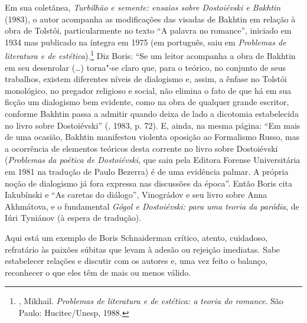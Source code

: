 Em sua coletânea, \emph{Turbilhão e semente: ensaios sobre Dostoiévski e
  Bakhtin} (1983), o autor acompanha as
modificações das visadas de Bakhtin em relação à obra de Tolstói,
particularmente no texto ``A palavra no romance'', iniciado em 1934 mas
publicado na íntegra em 1975 (em português, saiu em \emph{Problemas de
literatura e de estética}).\footnote{, Mikhail. \emph{Problemas
  de literatura e de estética: a teoria do romance}. São Paulo:
  Hucitec/Unesp, 1988.} Diz Boris: ``Se um leitor acompanha a obra de
Bakhtin em seu desenrolar (\ldots{}) torna"-se claro que, para o teórico, no
conjunto de seus trabalhos, existem diferentes níveis de dialogismo e,
assim, a ênfase no Tolstói monológico, no pregador religioso e social,
não elimina o fato de que há em sua ficção um dialogismo bem evidente,
como na obra de qualquer grande escritor, conforme Bakhtin passa a
admitir quando deixa de lado a dicotomia estabelecida no livro sobre
Dostoiévski'' (, 1983, p. 72). E, ainda, na mesma página:
``Em mais de uma ocasião, Bakhtin manifestou violenta oposição ao
Formalismo Russo, mas a ocorrência de elementos teóricos desta corrente
no livro sobre Dostoiévski (\emph{Problemas da poética de Dostoiévski},
que saiu pela Editora Forense Universitária em 1981 na tradução de Paulo
Bezerra) é de uma evidência palmar. A própria noção de dialogismo já
fora expressa nas discussões da época''. Então Boris cita Iakubínski e
``As caretas do diálogo'', Vinográdov e seu livro sobre Anna Akhmátova,
e o fundamental \emph{Gógol e Dostoiévski: para uma teoria da paródia},
de Iúri Tyniánov (à espera de tradução).

Aqui está um exemplo de Boris Schnaiderman crítico, atento, cuidadoso,
refratário às paixões súbitas que levam à adesão ou rejeição imediatas.
Sabe estabelecer relações e discutir com os autores e, uma vez feito o
balanço, reconhecer o que eles têm de mais ou menos válido.

